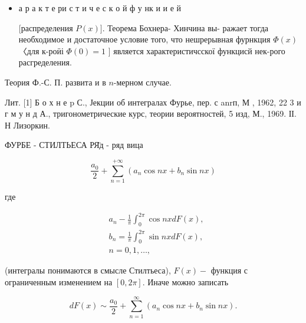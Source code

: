 \documentclass[10pt]{article}
\begin{document}
\begin{itemize}

  \item а р а к т е ри с т и ч е с к о й ф у нк и и е й

[распределения $P(x)]$. Теорема Бохнера- Хинчина вы- ражает тогда необходимое и достаточное условие того, что нешрерывная фурнкция $\Phi(x)$ 〈для к-роӥі $\Phi(0)=1$ ] является характеристичсскої функцисй нек-рого расгределения.

\end{itemize}



Теория Ф.-С. П. развита и в $n$-мерном случае.



Лит. [1] Б о х н е p С., Јекции об интегралах Фурье, пер. с anrп, М , 1962, 22 3 и г м у н д А., тригонометрические курс, теории вероятностей, 5 изд, М., 1969. ІІ. Н Лизоркин.



ФУРБЕ - СТИЛТЬЕСА РЯ̈д - ряд вица



\[

\frac{a_{0}}{2}+\sum_{n=1}^{+\infty}\left(a_{n} \cos n x+b_{n} \sin n x\right)

\]



где



\[

\begin{aligned}

& a_{n}-\frac{1}{\pi} \int_{0}^{2 \pi} \cos n x d F(x), \\

& b_{n}=\frac{1}{\pi} \int_{0}^{2 \pi} \sin n x d F(x), \\

& n=0,1, \ldots,

\end{aligned}

\]



(интегралы понимаются в смысле Стилтьеса), $F(x)-$ функция с ограниченным изменением на $[0,2 \pi]$. Иначе можно записать



\[

d F(x) \sim \frac{a_{0}}{2}+\sum_{n=1}^{\infty}\left(a_{n} \cos n x+b_{n} \sin n x\right) .

\]
\end{document}
